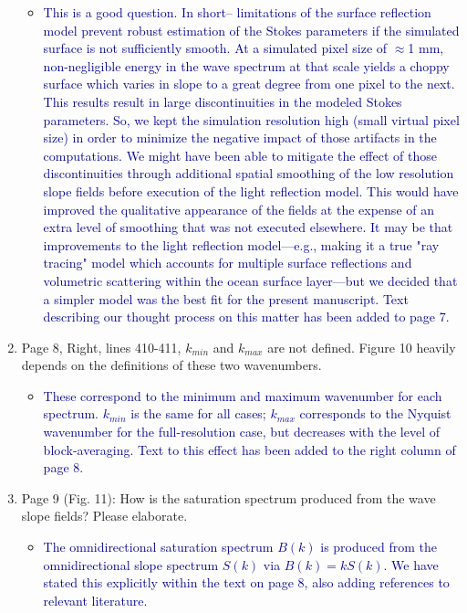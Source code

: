 \documentclass[14pt,letterpaper]{article}
\begin{document}
\begin{enumerate}
\begin{itemize}
        \item \textcolor{darkblue}{This is a good question. In short-- limitations of the surface reflection model prevent robust estimation of the Stokes parameters if the simulated surface is not sufficiently smooth. At a simulated pixel size of $\approx$1 mm, non-negligible energy in the wave spectrum at that scale yields a choppy surface which varies in slope to a great degree from one pixel to the next. This results result in large discontinuities in the modeled Stokes parameters. So, we kept the simulation resolution high (small virtual pixel size) in order to minimize the negative impact of those artifacts in the computations. We might have been able to mitigate the effect of those discontinuities through additional spatial smoothing of the low resolution slope fields before execution of the light reflection model. This would have improved the qualitative appearance of the fields at the expense of an extra level of smoothing that was not executed elsewhere. It may be that improvements to the light reflection model---e.g., making it a true "ray tracing" model which accounts for multiple surface reflections and volumetric scattering within the ocean surface layer---but we decided that a simpler model was the best fit for the present manuscript. Text describing our thought process on this matter has been added to page 7.}
    \end{itemize}
    \item Page 8, Right, lines 410-411, $k_{min}$ and $k_{max}$ are not defined. Figure 10 heavily depends on the definitions of these two wavenumbers.
    \begin{itemize}
        \item \textcolor{darkblue}{These correspond to the minimum and maximum wavenumber for each spectrum. $k_{min}$ is the same for all cases; $k_{max}$ corresponds to the Nyquist wavenumber for the full-resolution case, but decreases with the level of block-averaging. Text to this effect has been added to the right column of page 8.}
    \end{itemize}
    \item Page 9 (Fig. 11):  How is the saturation spectrum produced from the wave slope fields? Please elaborate. 
    \begin{itemize}
        \item \textcolor{darkblue}{The omnidirectional saturation spectrum $B(k)$ is produced from the omnidirectional slope spectrum $S(k)$ via $B(k)=kS(k)$. We have stated this explicitly within the text on page 8, also adding references to relevant literature.}
    \end{itemize}
\end{enumerate}
\end{document}
